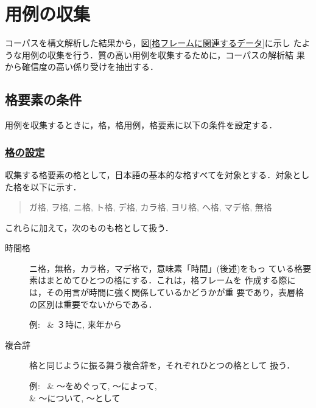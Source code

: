 \section{用例の収集}
\label{用例の収集}

コーパスを構文解析した結果から，図\ref{格フレームに関連するデータ}に示し
たような用例の収集を行う．質の高い用例を収集するために，コーパスの解析結
果から確信度の高い係り受けを抽出する．


\subsection{格要素の条件}
\label{格要素の条件}

用例を収集するときに，格，格用例，格要素に以下の条件を設定する．


\subsubsection*{\underline{格の設定}}

収集する格要素の格として，日本語の基本的な格すべてを対象とする．対象とし
た格を以下に示す．

\vspace*{1ex}

\begin{quote}
 ガ格, ヲ格, ニ格, ト格, デ格, カラ格, ヨリ格, ヘ格, マデ格, 無格 
\end{quote}

\vspace*{1ex}

\noindent
これらに加えて，次のものも格として扱う．

\begin{description}
 \item[時間格] ニ格，無格，カラ格，マデ格で，意味素「時間」(後述)をもっ
	    ている格要素はまとめてひとつの格にする．これは，格フレームを
	    作成する際には，その用言が時間に強く関係しているかどうかが重
	    要であり，表層格の区別は重要でないからである．

	    \begin{exn}
	     例: \ & ３時に, 来年から
	    \end{exn}
 \item[複合辞] 格と同じように振る舞う複合辞を，それぞれひとつの格として
	    扱う．

	    \begin{exn}
	     例: \ & 〜をめぐって, 〜によって, \\
	     & 〜について, 〜として
	    \end{exn}
\end{description}


